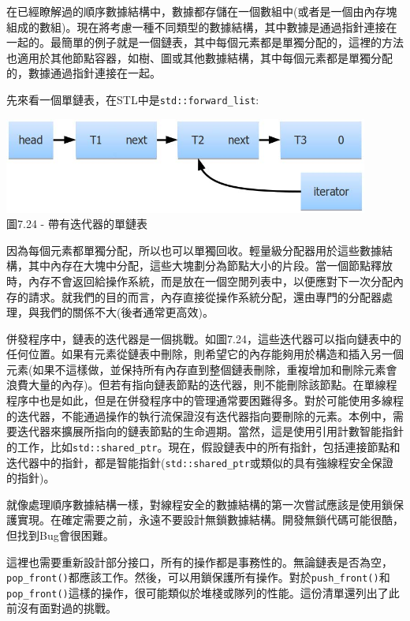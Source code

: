 
在已經瞭解過的順序數據結構中，數據都存儲在一個數組中(或者是一個由內存塊組成的數組)。現在將考慮一種不同類型的數據結構，其中數據是通過指針連接在一起的。最簡單的例子就是一個鏈表，其中每個元素都是單獨分配的，這裡的方法也適用於其他節點容器，如樹、圖或其他數據結構，其中每個元素都是單獨分配的，數據通過指針連接在一起。

先來看一個單鏈表，在STL中是\texttt{std::forward\_list}:

\begin{center}
\includegraphics[width=0.9\textwidth]{content/2/chapter7/images/24.jpg}\\
圖7.24 - 帶有迭代器的單鏈表
\end{center}

因為每個元素都單獨分配，所以也可以單獨回收。輕量級分配器用於這些數據結構，其中內存在大塊中分配，這些大塊劃分為節點大小的片段。當一個節點釋放時，內存不會返回給操作系統，而是放在一個空閒列表中，以便應對下一次分配內存的請求。就我們的目的而言，內存直接從操作系統分配，還由專門的分配器處理，與我們的關係不大(後者通常更高效)。

併發程序中，鏈表的迭代器是一個挑戰。如圖7.24，這些迭代器可以指向鏈表中的任何位置。如果有元素從鏈表中刪除，則希望它的內存能夠用於構造和插入另一個元素(如果不這樣做，並保持所有內存直到整個鏈表刪除，重複增加和刪除元素會浪費大量的內存)。但若有指向鏈表節點的迭代器，則不能刪除該節點。在單線程程序中也是如此，但是在併發程序中的管理通常要困難得多。對於可能使用多線程的迭代器，不能通過操作的執行流保證沒有迭代器指向要刪除的元素。本例中，需要迭代器來擴展所指向的鏈表節點的生命週期。當然，這是使用引用計數智能指針的工作，比如\texttt{std::shared\_ptr}。現在，假設鏈表中的所有指針，包括連接節點和迭代器中的指針，都是智能指針(\texttt{std::shared\_ptr}或類似的具有強線程安全保證的指針)。

就像處理順序數據結構一樣，對線程安全的數據結構的第一次嘗試應該是使用鎖保護實現。在確定需要之前，永遠不要設計無鎖數據結構。開發無鎖代碼可能很酷，但找到Bug會很困難。

這裡也需要重新設計部分接口，所有的操作都是事務性的。無論鏈表是否為空，\texttt{pop\_front()}都應該工作。然後，可以用鎖保護所有操作。對於\texttt{push\_front()}和\texttt{pop\_front()}這樣的操作，很可能類似於堆棧或隊列的性能。這份清單還列出了此前沒有面對過的挑戰。

